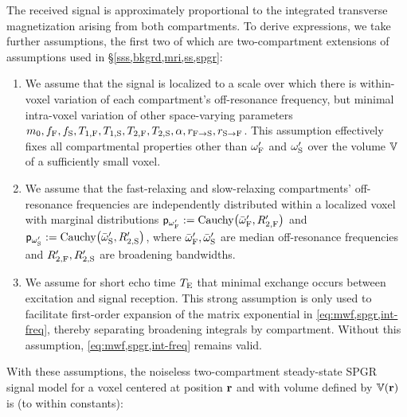 The received signal
is approximately proportional
to the integrated transverse magnetization
arising from both compartments.
To derive expressions,
we take further assumptions,
the first two of which are two-compartment extensions 
of assumptions used 
in \S\ref{sss,bkgrd,mri,ss,spgr}: 
\begin{enumerate}
	\item
		We assume
		that the signal is localized
		to a scale over which 
		there is within-voxel variation
		of each compartment's off-resonance frequency,
		but minimal intra-voxel variation
		of other space-varying parameters
		$m_0, f_{\mathrm{F}}, f_{\mathrm{S}}, T_{1,\mathrm{F}}, T_{1,\mathrm{S}}, T_{2,\mathrm{F}}, T_{2,\mathrm{S}}, \alpha, r_{\mathrm{F}\to\mathrm{S}}, r_{\mathrm{S}\to\mathrm{F}}$.
		This assumption effectively fixes all compartmental properties 
		other than $\omega'_{\mathrm{F}}$ and $\omega'_{\mathrm{S}}$
		over the volume $\mathbb{V}$ of a sufficiently small voxel.
		\label{item:spgr,int}
		
	\item 
		We assume 
		that the fast-relaxing
		and slow-relaxing compartments' off-resonance frequencies	
		are independently distributed 
		within a localized voxel 
		with marginal distributions
		$\dist{\ompf} := \operatorname{Cauchy}\paren{\ompfmed,\Rtpf}$
		and $\dist{\omps} := \operatorname{Cauchy}\paren{\ompsmed,\Rtps}$,
		where $\bar{\omega}_{\mathrm{F}}',\bar{\omega}_{\mathrm{S}}'$ are median off-resonance frequencies
		and $R_{2,\mathrm{F}}',R_{2,\mathrm{S}}'$ are broadening bandwidths.
		\label{item:spgr,freq}
		
	\item 
		We assume 
		for short echo time $T_\mathrm{E}$
		that minimal exchange occurs
		between excitation and signal reception.
		This strong assumption 
		is only used 
		to facilitate first-order expansion
		of the matrix exponential 
		in \eqref{eq:mwf,spgr,int-freq},
		thereby separating broadening integrals 
		by compartment.
		Without this assumption,
		\eqref{eq:mwf,spgr,int-freq} remains valid.
		\label{item:spgr,exchg0}
\end{enumerate}
With these assumptions,
the noiseless two-compartment steady-state SPGR signal model
for a voxel
centered at position $\mathbf{r}$ 
and with volume defined by $\setV\pr$ 
is (to within constants):
